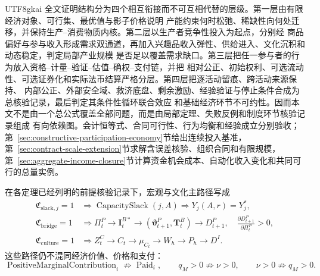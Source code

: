 \documentclass[12pt,a4paper,openany]{report}
\DeclareMathOperator{\CapacitySlack}{CapacitySlack}
\DeclareMathOperator{\Paid}{Paid}
\begin{document}
\begin{CJK*}{UTF8}{gkai}
全文证明结构分为四个相互衔接而不可互相代替的层级。第一层由有限经济对象、可行集、最优值与影子价格说明
产能约束何时松弛、稀缺性向何处迁移，并保持生产--消费物质内核。第二层以生产者竞争性投入为起点，分别经
商品偏好与参与收入形成需求双通道，再加入兴趣品收入弹性、供给进入、文化沉积和动态稳定，判定局部产业规模
是否足以覆盖需求缺口。第三层把任一参与者的行为放入资格--计量--验证--估值--确权--支付链，并把
相对公正、初始权利、可选流动性、可选证券化和实际法币结算严格分层。第四层把逐活动留痕、跨活动来源保持、
内部公正、外部安全域、救济底盘、剩余激励、经验验证与停止条件合成为总核验记录，最后判定其条件性循环联合效应
和基础经济环节不可约性。因而本文不是由一个总公式覆盖全部问题，而是由局部定理、失败反例和制度环节核验记录组成
有向依赖图。会计恒等式、合同可行性、行为均衡和经验成立分别验收；第~\ref{sec:constructive-participation-economy}节给出连续投入基准，第~\ref{sec:contract-scale-extension}节求解含误差核验、组织合同和有限规模，第~\ref{sec:aggregate-income-closure}节计算资金机会成本、自动化收入变化和共同可行的总量实例。

在各定理已经列明的前提核验记录下，宏观与文化主路径写成
\[
\boxed{
\begin{aligned}
  \mathfrak C_{\mathrm{slack},j}=1
  &\Longrightarrow
  \CapacitySlack(j,A)
  \Longrightarrow Y_j(A,r)=Y_j^*,\\
  \mathfrak C_{\mathrm{bridge}}=1
  &\Longrightarrow
  \Pi_t^P\to\mathbf I_t^{B*}\to
  (\boldsymbol\vartheta_{t+1}^P,\mathbf T_t^B)
  \to D_{t+1}^P,
  \quad
  \frac{\partial D_{t+1}^P}{\partial\Pi_t^P}>0,\\
  \mathfrak C_{\mathrm{culture}}=1
  &\Longrightarrow
  Z_t^C\to C_t\to\mu_{C_t}\to W_h\to P_h\to D^I.
\end{aligned}}
\]
这些路径仍不混同经济价值、价格和支付：
\[
  \operatorname{PositiveMarginalContribution}_i
  \not\Longrightarrow \Paid_i,
  \qquad
  q_M>0\not\Longrightarrow\nu>0,
  \qquad
  \nu>0\not\Longrightarrow q_M>0.
\]


\end{CJK*}
\end{document}
